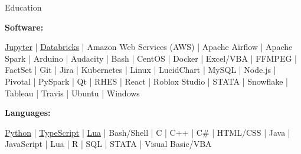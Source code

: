 \documentclass{resume/resume}
\begin{document}
\begin{rSection}{Education}
\begin{adjustwidth}{6em}{0pt}
\end{adjustwidth}



\vspace{-3pt}
{\bf Software:}
\vspace{-1.83em}
\begin{adjustwidth}{6em}{0pt}
    \href{https://github.com/search?q=user\%3ASpelkington+user\%3AUtahTriangle+extension\%3Aipynb&type=Code}{Jupyter} | 
    \href{https://github.com/search?q=user\%3ASpelkington+databricks&type=Code}{Databricks} | 
    Amazon Web Services (AWS) | 
    Apache Airflow | 
    Apache Spark | 
    Arduino | 
    Audacity | 
    Bash | 
    CentOS | 
    Docker | 
    Excel/VBA | 
    FFMPEG | 
    FactSet |
    Git |
    Jira |
    Kubernetes | 
    Linux |
    LucidChart |
    MySQL | 
    Node.js | 
    Pivotal | 
    PySpark | 
    Qt | 
    RHES | 
    React | 
    Roblox Studio | 
    STATA | 
    Snowflake | 
    Tableau | 
    Travis | 
    Ubuntu | 
    Windows

\end{adjustwidth}

\end{rSection}



\vspace{-0.4em}
{\bf Languages:}
\vspace{-1.83em}
\begin{adjustwidth}{6em}{0pt}
    \href{https://github.com/search?q=user\%3ASpelkington+user\%3AUtahTriangle+extension\%3Apy+extension\%3Aipynb&type=Code&ref=advsearch&l=&l=}{Python} | 
    \href{https://github.com/search?p=1&q=user\%3ASpelkington+extension\%3Ats+extension\%3Atsx&type=Code}{TypeScript} | 
    \href{https://github.com/search?q=user\%3ASpelkington+extension\%3Alua&type=Code}{Lua} | 
    Bash/Shell | 
    C | 
    C++ |
    C\# |
    HTML/CSS |
    Java | 
    JavaScript | 
    Lua | 
    R |
    SQL | 
    STATA |
    Visual Basic/VBA
\end{adjustwidth}

\end{document}
